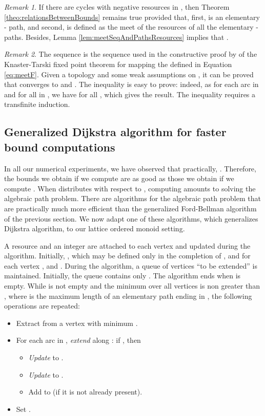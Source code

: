 \documentclass[11pt]{amsart}
\theoremstyle{plain}
\theoremstyle{remark}
\newtheorem{rem}{Remark}
\begin{document}
\begin{rem}
If there are cycles with negative resources in , then Theorem \ref{theo:relationsBetweenBounds} remains true provided that, first,  is an elementary - path, and second,  is defined as the meet of the resources of all the elementary - paths.
Besides, Lemma \ref{lem:meetSeqAndPathsResources} implies that .
\end{rem}

\begin{rem}\label{rem:cousotSequence}
The sequence  is the sequence used in the constructive proof by \citet{cousot1979constructive} of the Knaster-Tarski fixed point theorem for mapping the  defined in Equation \eqref{eq:meetF}. Given a topology and some weak assumptions on , it can be proved that  converges to  and . The inequality  is easy to prove: indeed, as  for each arc  in  and for all  in , we have   for all , which gives the result. The inequality  requires a transfinite induction.
\end{rem}

\subsection{Generalized Dijkstra algorithm for faster bound computations} 
\label{sub:generalizedDijkstra}





In all our numerical experiments, we have observed that practically, . Therefore, the bounds we obtain if we compute  are as good as those we obtain if we compute . When  distributes with respect to , computing  amounts to solving the algebraic path problem. There are algorithms for the algebraic path problem that are practically much more efficient than the generalized Ford-Bellman algorithm of the previous section. We now adapt one of these algorithms, which generalizes Dijkstra algorithm, to our lattice ordered monoid setting. 



A resource  and an integer  are attached to each vertex  and updated during the algorithm. Initially, , which may be defined only in the completion of , and  for each vertex , and .
During the algorithm, a queue  of vertices ``to be extended'' is maintained. Initially, the queue  contains only . The algorithm ends when  is empty. While  is not empty and the minimum  over all vertices  is non greater than , where  is the maximum length of an elementary path ending in , the following operations are repeated:
\begin{itemize}
\item Extract from  a vertex  with minimum . 
\item For each arc  in , {\em extend}  along : if , then
	\begin{itemize}
	\item {\em Update}  to .
	\item {\em Update}  to .
	\item Add  to  (if it is not already present).
	\end{itemize}
\item Set .
\end{itemize}
\end{document}
